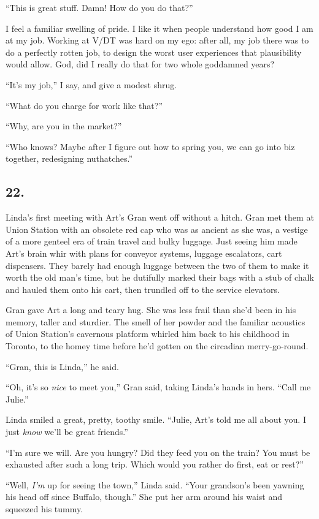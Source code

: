 “This is great stuff. Damn! How do you do that?”

I feel a familiar swelling of pride. I like it when people
understand how good I am at my job. Working at V/DT was hard on my
ego: after all, my job there was to do a perfectly rotten job, to
design the worst user experiences that plausibility would allow.
God, did I really do that for two whole goddamned years?

“It’s my job,” I say, and give a modest shrug.

“What do you charge for work like that?”

“Why, are you in the market?”

“Who knows? Maybe after I figure out how to spring you, we can go
into biz together, redesigning nuthatches.”

\subsection{22.}

Linda’s first meeting with Art’s Gran went off without a hitch.
Gran met them at Union Station with an obsolete red cap who was as
ancient as she was, a vestige of a more genteel era of train travel
and bulky luggage. Just seeing him made Art’s brain whir with plans
for conveyor systems, luggage escalators, cart dispensers. They
barely had enough luggage between the two of them to make it worth
the old man’s time, but he dutifully marked their bags with a stub
of chalk and hauled them onto his cart, then trundled off to the
service elevators.

Gran gave Art a long and teary hug. She was less frail than she’d
been in his memory, taller and sturdier. The smell of her powder
and the familiar acoustics of Union Station’s cavernous platform
whirled him back to his childhood in Toronto, to the homey time
before he’d gotten on the circadian merry-go-round.

“Gran, this is Linda,” he said.

“Oh, it’s so \emph{nice} to meet you,” Gran said, taking Linda’s
hands in hers. “Call me Julie.”

Linda smiled a great, pretty, toothy smile. “Julie, Art’s told me
all about you. I just \emph{know} we’ll be great friends.”

“I’m sure we will. Are you hungry? Did they feed you on the train?
You must be exhausted after such a long trip. Which would you
rather do first, eat or rest?”

“Well, \emph{I’m} up for seeing the town,” Linda said. “Your
grandson’s been yawning his head off since Buffalo, though.” She
put her arm around his waist and squeezed his tummy.


